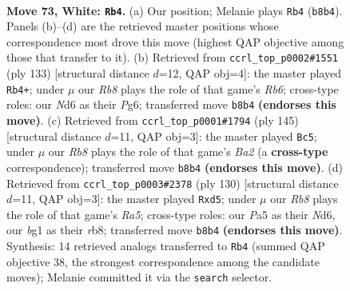 \documentclass[11pt]{article}
\begin{document}
\clearpage

\begin{figure}[p]\centering
\begin{subfigure}{0.46\textwidth}\centering
\resizebox{\linewidth}{!}{%
\newchessgame
\chessboard[
  setfen={1R6/6k1/3Nn3/P7/8/7r/3K4/6b1 w - - 13 73},
  showmover=false,
  pgfstyle=straightmove, color=movearrow, markmove={b8-b4}
]}
\caption{}
\end{subfigure}\hfill
\begin{subfigure}{0.46\textwidth}\centering
\resizebox{\linewidth}{!}{%
\newchessgame
\chessboard[
  setfen={8/6k1/R5p1/6N1/4K3/1r6/8/8 b - - 10 67},
  showmover=false,
  pgfstyle=straightmove, color=movearrow, markmove={b3-b4}
]}
\caption{}
\end{subfigure}
\\[4pt]
\begin{subfigure}{0.46\textwidth}\centering
\resizebox{\linewidth}{!}{%
\newchessgame
\chessboard[
  setfen={8/b5k1/8/3N4/7p/2K4B/8/8 b - - 12 73},
  showmover=false,
  pgfstyle=straightmove, color=movearrow, markmove={a7-c5}
]}
\caption{}
\end{subfigure}\hfill
\begin{subfigure}{0.46\textwidth}\centering
\resizebox{\linewidth}{!}{%
\newchessgame
\chessboard[
  setfen={1r6/8/3N1k2/R2n4/8/8/4K3/8 w - - 4 66},
  showmover=false,
  pgfstyle=straightmove, color=movearrow, markmove={a5-d5}
]}
\caption{}
\end{subfigure}
\caption{\textbf{Move 73, White: \texttt{Rb4}.} (a) Our position; Melanie plays \texttt{Rb4} (\texttt{b8b4}). Panels (b)--(d) are the retrieved master positions whose correspondence most drove this move (highest QAP objective among those that transfer to it). (b) Retrieved from \texttt{ccrl\_top\_p0002\#1551} (ply 133) [structural distance $d$=12, QAP obj=4]: the master played \texttt{Rb4+}; under $\mu$ our \emph{Rb8} plays the role of that game's \emph{Rb6}; cross-type roles: our \emph{N}d6 as their \emph{P}g6; transferred move \texttt{b8b4} \textbf{(endorses this move)}. (c) Retrieved from \texttt{ccrl\_top\_p0001\#1794} (ply 145) [structural distance $d$=11, QAP obj=3]: the master played \texttt{Bc5}; under $\mu$ our \emph{Rb8} plays the role of that game's \emph{Ba2} (a \textbf{cross-type} correspondence); transferred move \texttt{b8b4} \textbf{(endorses this move)}. (d) Retrieved from \texttt{ccrl\_top\_p0003\#2378} (ply 130) [structural distance $d$=11, QAP obj=3]: the master played \texttt{Rxd5}; under $\mu$ our \emph{Rb8} plays the role of that game's \emph{Ra5}; cross-type roles: our \emph{P}a5 as their \emph{N}d6, our \emph{b}g1 as their \emph{r}b8; transferred move \texttt{b8b4} \textbf{(endorses this move)}. Synthesis: 14 retrieved analogs transferred to \texttt{Rb4} (summed QAP objective 38, the strongest correspondence among the candidate moves); Melanie committed it via the \texttt{search} selector.}
\label{fig:thought-m144}
\end{figure}
\end{document}
